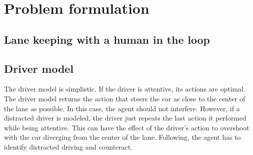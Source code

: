 \chapter{Problem formulation}
\label{sec:problem}




\section{Lane keeping with a human in the loop}


\section{Driver model}

The driver model is simplistic. If the driver is attentive, its actions are optimal. The driver model returns the action that steers the car as close to the center of the lane as possible. In this case, the agent should not interfere. However, if a distracted driver is modeled, the driver just repeats the last action it performed while being attentive. This can have the effect of the driver's action to overshoot with the car diverging from the center of the lane. Following, the agent has to identify distracted driving and counteract.

